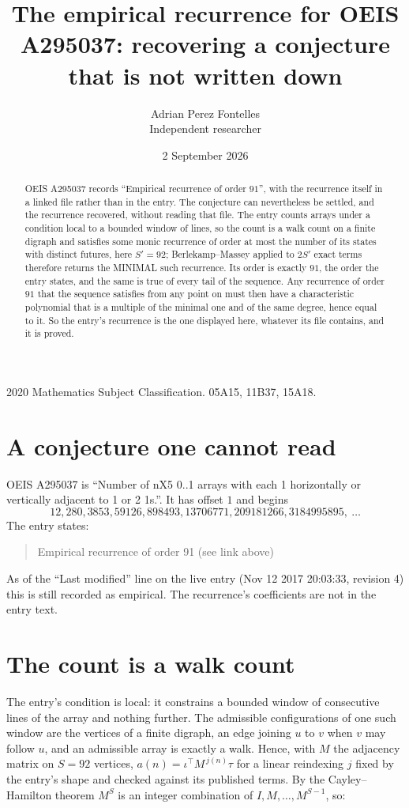 \documentclass[11pt,a4paper]{article}
\title{The empirical recurrence for OEIS A295037: recovering a conjecture that is not written down}
\author{Adrian Perez Fontelles\\ \small Independent researcher}
\date{2 September 2026}
\theoremstyle{plain}
\theoremstyle{definition}
\begin{document}
\maketitle

\begin{abstract}
OEIS A295037 records ``Empirical recurrence of order $91$'', with the recurrence itself in a
linked file rather than in the entry. The conjecture can nevertheless be settled, and the
recurrence recovered, without reading that file. The entry counts arrays under a condition
local to a bounded window of lines, so the count is a walk count on a finite digraph and
satisfies some monic recurrence of order at most the number of its states with distinct
futures, here $S'=92$; Berlekamp--Massey applied to $2S'$ exact
terms therefore returns the MINIMAL such recurrence. Its order is exactly $91$, the order
the entry states, and the same is true of every tail of the sequence. Any recurrence of order
$91$ that the sequence satisfies from any point on must then have a characteristic
polynomial that is a multiple of the minimal one and of the same degree, hence equal to it. So
the entry's recurrence is the one displayed here, whatever its file contains, and it is
proved.
\end{abstract}

\noindent\small 2020 Mathematics Subject Classification. 05A15, 11B37, 15A18.\normalsize

\section{A conjecture one cannot read}

OEIS A295037 is ``Number of nX5 0..1 arrays with each 1 horizontally or vertically adjacent to 1 or 2 1s.''. It has offset $1$ and begins
\[
12, 280, 3853, 59126, 898493, 13706771, 209181266, 3184995895,\ \dots
\]
The entry states:
\begin{quote}
Empirical recurrence of order 91 (see link above)
\end{quote}
As of the ``Last modified'' line on the live entry (Nov 12 2017 20:03:33, revision 4) this is still
recorded as empirical. The recurrence's coefficients are not in the entry text.

\section{The count is a walk count}

The entry's condition is local: it constrains a bounded window of consecutive lines of the
array and nothing further. The admissible configurations of one such window are the vertices
of a finite digraph, an edge joining $u$ to $v$ when $v$ may follow $u$, and an admissible
array is exactly a walk. Hence, with $M$ the adjacency matrix on $S=92$ vertices,
$a(n)=\iota^{\!\top}M^{\,j(n)}\tau$ for a linear reindexing $j$ fixed by the entry's shape
and checked against its published terms. By the Cayley--Hamilton theorem $M^{S}$ is an
integer combination of $I,M,\dots,M^{S-1}$, so:
\end{document}
